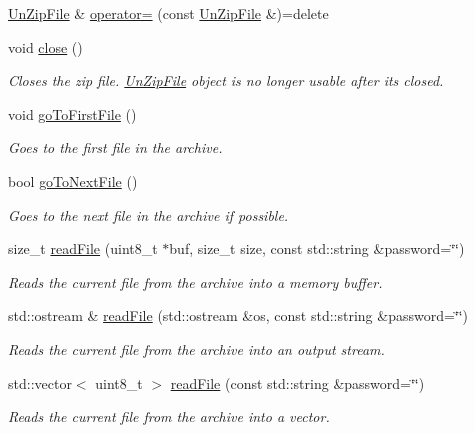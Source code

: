 \begin{DoxyCompactItemize}
\hyperlink{classdg_1_1deepcore_1_1_un_zip_file}{Un\+Zip\+File} \& \hyperlink{classdg_1_1deepcore_1_1_un_zip_file_af550bb1d0ede835cd3b6c7a1c5d94239}{operator=} (const \hyperlink{classdg_1_1deepcore_1_1_un_zip_file}{Un\+Zip\+File} \&)=delete
\item 
void \hyperlink{group___utility_module_ga6f28d71dffa80123aaa68ebf44783d0c}{close} ()
\begin{DoxyCompactList}\small\item\em Closes the zip file. \hyperlink{classdg_1_1deepcore_1_1_un_zip_file}{Un\+Zip\+File} object is no longer usable after it\textquotesingle{}s closed. \end{DoxyCompactList}\item 
void \hyperlink{group___utility_module_ga065f405804b43cb3fdabca1fe7bd095a}{go\+To\+First\+File} ()
\begin{DoxyCompactList}\small\item\em Goes to the first file in the archive. \end{DoxyCompactList}\item 
bool \hyperlink{group___utility_module_ga88b7a33f99cbcc1748da060b7233cb9a}{go\+To\+Next\+File} ()
\begin{DoxyCompactList}\small\item\em Goes to the next file in the archive if possible. \end{DoxyCompactList}\item 
size\+\_\+t \hyperlink{group___utility_module_ga16985655d6b3bf1f05330d54ca736b0e}{read\+File} (uint8\+\_\+t $\ast$buf, size\+\_\+t size, const std\+::string \&password=\char`\"{}\char`\"{})
\begin{DoxyCompactList}\small\item\em Reads the current file from the archive into a memory buffer. \end{DoxyCompactList}\item 
std\+::ostream \& \hyperlink{group___utility_module_ga2139dc65cb701db211a8fe4970232307}{read\+File} (std\+::ostream \&os, const std\+::string \&password=\char`\"{}\char`\"{})
\begin{DoxyCompactList}\small\item\em Reads the current file from the archive into an output stream. \end{DoxyCompactList}\item 
std\+::vector$<$ uint8\+\_\+t $>$ \hyperlink{group___utility_module_gaf6c3c8e93c73b827d8dcd06c7b0aa1f8}{read\+File} (const std\+::string \&password=\char`\"{}\char`\"{})
\begin{DoxyCompactList}\small\item\em Reads the current file from the archive into a vector. \end{DoxyCompactList}\item 

\end{DoxyCompactItemize}
